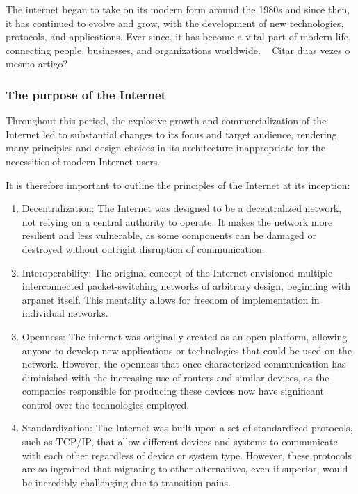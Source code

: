 The internet began to take on its modern form around the 1980s and since then, it has continued to evolve and grow, with the development of new technologies, protocols, and applications. Ever since, it has become a vital part of modern life, connecting people, businesses, and organizations worldwide.
~\cite{leiner_brief_2009} Citar duas vezes o mesmo artigo?


\subsubsection{The purpose of the Internet}
Throughout this period, the explosive growth and commercialization of the Internet led to substantial changes to its focus and target audience, rendering many principles and design choices in its architecture inappropriate for the necessities of modern Internet users.

It is therefore important to outline the principles of the Internet at its inception:

\begin{enumerate}
	\item Decentralization: The Internet was designed to be a decentralized network, not relying on a central authority to operate. It makes the network more resilient and less vulnerable, as some components can be damaged or destroyed without outright disruption of communication.

	\item Interoperability: The original concept of the Internet envisioned multiple interconnected packet-switching networks of arbitrary design, beginning with \gls{arpanet} itself. This mentality allows for freedom of implementation in individual networks.

    \item Openness: The internet was originally created as an open platform, allowing anyone to develop new applications or technologies that could be used on the network. However, the openness that once characterized communication has diminished with the increasing use of routers and similar devices, as the companies responsible for producing these devices now have significant control over the technologies employed.

	\item Standardization: The Internet was built upon a set of standardized protocols, such as TCP/IP, that allow different devices and systems to communicate with each other regardless of device or system type. However, these protocols are so ingrained that migrating to other alternatives, even if superior, would be incredibly challenging due to transition pains.
	
\end{enumerate}

